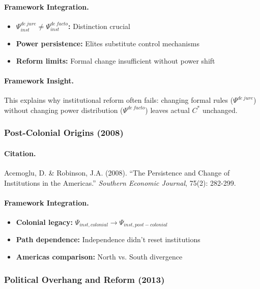 \paragraph{Framework Integration.}
\begin{itemize}
  \item \textbf{$\Psi_{inst}^{de\ jure} \neq \Psi_{inst}^{de\ facto}$:} Distinction crucial
  \item \textbf{Power persistence:} Elites substitute control mechanisms
  \item \textbf{Reform limits:} Formal change insufficient without power shift
\end{itemize}

\paragraph{Framework Insight.}
This explains why institutional reform often fails: changing formal rules
($\Psi^{de\ jure}$) without changing power distribution ($\Psi^{de\ facto}$)
leaves actual $C^*$ unchanged.

\subsubsection{Post-Colonial Origins (2008)}

\paragraph{Citation.}
Acemoglu, D. \& Robinson, J.A. (2008).
``The Persistence and Change of Institutions in the Americas.''
\emph{Southern Economic Journal}, 75(2): 282-299.

\paragraph{Framework Integration.}
\begin{itemize}
  \item \textbf{Colonial legacy:} $\Psi_{inst,colonial} \to \Psi_{inst,post-colonial}$
  \item \textbf{Path dependence:} Independence didn't reset institutions
  \item \textbf{Americas comparison:} North vs. South divergence
\end{itemize}

\subsubsection{Political Overhang and Reform (2013)}

